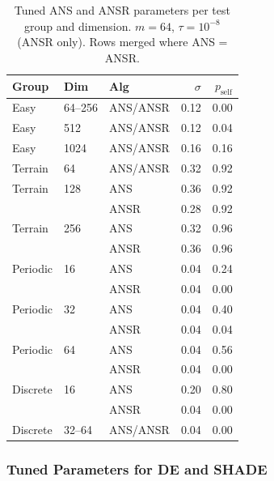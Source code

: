 \documentclass[11pt,a4paper]{article}
\begin{document}
\begin{table}[ht]
\centering
\caption{Tuned ANS and ANSR parameters per test group and dimension. $m = 64$, $\tau = 10^{-8}$ (ANSR only). Rows merged where ANS = ANSR.}
\label{tab:params_ans}
\begin{tabular}{@{}lllrr@{}}
\toprule
Group & Dim & Alg & $\sigma$ & $p_{\text{self}}$ \\
\midrule
Easy & 64--256 & ANS/ANSR & 0.12 & 0.00 \\
Easy & 512     & ANS/ANSR & 0.12 & 0.04 \\
Easy & 1024    & ANS/ANSR & 0.16 & 0.16 \\
\midrule
Terrain & 64  & ANS/ANSR & 0.32 & 0.92 \\
Terrain & 128 & ANS      & 0.36 & 0.92 \\
        &     & ANSR     & 0.28 & 0.92 \\
Terrain & 256 & ANS      & 0.32 & 0.96 \\
        &     & ANSR     & 0.36 & 0.96 \\
\midrule
Periodic & 16 & ANS      & 0.04 & 0.24 \\
         &    & ANSR     & 0.04 & 0.00 \\
Periodic & 32 & ANS      & 0.04 & 0.40 \\
         &    & ANSR     & 0.04 & 0.04 \\
Periodic & 64 & ANS      & 0.04 & 0.56 \\
         &    & ANSR     & 0.04 & 0.00 \\
\midrule
Discrete & 16    & ANS      & 0.20 & 0.80 \\
         &       & ANSR     & 0.04 & 0.00 \\
Discrete & 32--64 & ANS/ANSR & 0.04 & 0.00 \\
\bottomrule
\end{tabular}
\end{table}

\subsubsection{Tuned Parameters for DE and SHADE}
\end{document}
